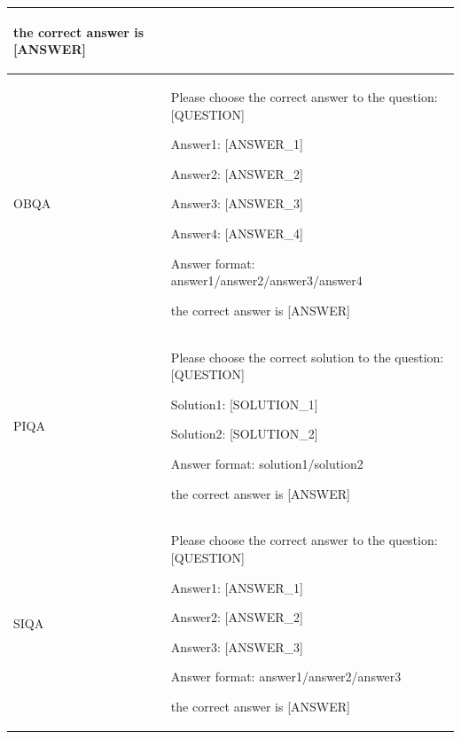 \documentclass{article} %
\theoremstyle{plain}
\theoremstyle{definition}
\begin{document}
\begin{table}[H]
\begin{tabularx}{\textwidth}{lX}
\begin{minipage}{\linewidth}
\begin{tcolorbox}[colback=gray!10,colframe=black!75!black, left=1mm, right=1mm, top=1mm, bottom=1mm]
the correct answer is [ANSWER]
\end{tcolorbox}
\end{minipage} \\
\midrule


OBQA & 
\begin{minipage}{\linewidth}
\begin{tcolorbox}[colback=gray!10,colframe=black!75!black, left=1mm, right=1mm, top=1mm, bottom=1mm]
Please choose the correct answer to the question: [QUESTION] 

Answer1: [ANSWER\_1]

Answer2: [ANSWER\_2]

Answer3: [ANSWER\_3]

Answer4: [ANSWER\_4]

Answer format: answer1/answer2/answer3/answer4

the correct answer is [ANSWER]
\end{tcolorbox}
\end{minipage} \\
\midrule


PIQA & 
\begin{minipage}{\linewidth}
\begin{tcolorbox}[colback=gray!10,colframe=black!75!black, left=1mm, right=1mm, top=1mm, bottom=1mm]
Please choose the correct solution to the question: [QUESTION]

Solution1: [SOLUTION\_1]

Solution2: [SOLUTION\_2]

Answer format: solution1/solution2 

the correct answer is [ANSWER]
\end{tcolorbox}
\end{minipage} \\
\midrule


SIQA & 
\begin{minipage}{\linewidth}
\begin{tcolorbox}[colback=gray!10,colframe=black!75!black, left=1mm, right=1mm, top=1mm, bottom=1mm]
Please choose the correct answer to the question: [QUESTION]

Answer1: [ANSWER\_1]

Answer2: [ANSWER\_2]

Answer3: [ANSWER\_3]

Answer format: answer1/answer2/answer3 

the correct answer is [ANSWER]
\end{tcolorbox}
\end{minipage} \\
\midrule



\end{tabularx}
\end{table}
\end{document}

